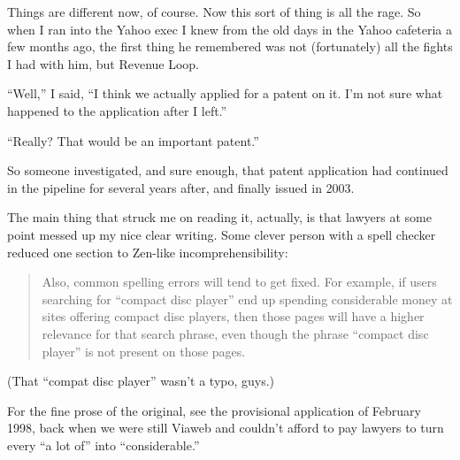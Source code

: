 Things are different now, of course. Now this sort of thing is all the
rage. So when I ran into the Yahoo exec I knew from the old days in the
Yahoo cafeteria a few months ago, the first thing he remembered was not
(fortunately) all the fights I had with him, but Revenue Loop.

``Well,'' I said, ``I think we actually applied for a patent on it. I'm
not sure what happened to the application after I left.''

``Really? That would be an important patent.''

So someone investigated, and sure enough, that patent application had
continued in the pipeline for several years after, and finally issued in
2003.

The main thing that struck me on reading it, actually, is that lawyers
at some point messed up my nice clear writing. Some clever person with a
spell checker reduced one section to Zen-like incomprehensibility:

\begin{quote}
Also, common spelling errors will tend to get fixed. For example, if
users searching for ``compact disc player'' end up spending considerable
money at sites offering compact disc players, then those pages will have
a higher relevance for that search phrase, even though the phrase
``compact disc player'' is not present on those pages.
\end{quote}

(That ``compat disc player'' wasn't a typo, guys.)

For the fine prose of the original, see the provisional application of
February 1998, back when we were still Viaweb and couldn't afford to pay
lawyers to turn every ``a lot of'' into ``considerable.''

